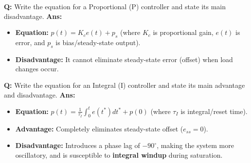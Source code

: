 \documentclass[10pt,a4paper,twocolumn]{article}
\begin{document}
\begin{tcolorbox}[
  colback=white,
  colframe=UnitColorTwo,
  colbacktitle=gray!10!white,
  coltitle=black,
  fonttitle=\bfseries\sffamily\small,
  title={Unit II $\bullet$ Card 1: Proportional (P) Control Action},
  boxrule=1.2pt,
  arc=2mm,
  outer arc=2mm,
  boxsep=1.5mm,
  top=1mm,
  bottom=1mm,
  left=1.5mm,
  right=1.5mm,
  before skip=2.5mm,
  after skip=2.5mm
]
\textbf{Q:} Write the equation for a Proportional (P) controller and state its main disadvantage.
\tcbline
\textbf{Ans:} \begin{itemize}
  \item   \textbf{Equation:} $p(t) = K_c e(t) + p_s$ (where $K_c$ is proportional gain, $e(t)$ is error, and $p_s$ is bias/steady-state output).
  \item   \textbf{Disadvantage:} It cannot eliminate steady-state error (offset) when load changes occur.
\end{itemize}
\end{tcolorbox}


\begin{tcolorbox}[
  colback=white,
  colframe=UnitColorTwo,
  colbacktitle=gray!10!white,
  coltitle=black,
  fonttitle=\bfseries\sffamily\small,
  title={Unit II $\bullet$ Card 2: Integral (I) Control Action (Reset)},
  boxrule=1.2pt,
  arc=2mm,
  outer arc=2mm,
  boxsep=1.5mm,
  top=1mm,
  bottom=1mm,
  left=1.5mm,
  right=1.5mm,
  before skip=2.5mm,
  after skip=2.5mm
]
\textbf{Q:} Write the equation for an Integral (I) controller and state its main advantage and disadvantage.
\tcbline
\textbf{Ans:} \begin{itemize}
  \item   \textbf{Equation:} $p(t) = \frac{1}{\tau_I} \int_0^t e(t^*) dt^* + p(0)$ (where $\tau_I$ is integral/reset time).
  \item   \textbf{Advantage:} Completely eliminates steady-state offset ($e_{ss} = 0$).
  \item   \textbf{Disadvantage:} Introduces a phase lag of $-90^\circ$, making the system more oscillatory, and is susceptible to \textbf{integral windup} during saturation.
\end{itemize}
\end{tcolorbox}
\end{document}
